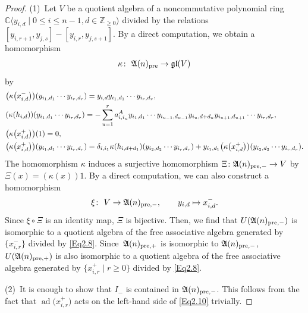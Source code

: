 \documentclass[pdftex]{sigma}
\numberwithin{equation}{section}
\theoremstyle{definition}
\DeclareMathOperator{\ad}{ad}
\begin{document}
\begin{proof} %
\textup{(1)}\ Let $V$ be a quotient algebra of a noncommutative polynomial ring $\mathbb{C}\langle y_{i,d}\mid0\leq i\leq n-1,d\in\mathbb{Z}_{\geq0}\rangle$ divided by the relations $[y_{i,r+1},y_{j,s}]-[y_{i,r},y_{j,s+1}]$. By a direct computation, we obtain a homomorphism
\begin{align*}
\kappa\colon\ \mathfrak{A}(n)_{{\rm pre}}\to\mathfrak{gl}(V)
\end{align*}
by
\begin{align*}
\begin{split}
&\bigl(\kappa\bigl(x^-_{i,d}\bigr)\bigr)(y_{i_1,d_1}\cdots y_{i_r,d_r})=y_{i,d}y_{i_1,d_1}\cdots y_{i_r,d_r},\\
&(\kappa(h_{i,d}))(y_{i_1,d_1}\cdots y_{i_r,d_r})=-\sum_{u=1}^r\limits a^A_{i,i_u}y_{i_1,d_1}\cdots y_{i_{u-1},d_{u-1}}y_{i_u,d+d_u}y_{i_{u+1},d_{u+1}}\cdots y_{i_r,d_r},\\
&\bigl(\kappa\bigl(x^+_{i,d}\bigr)\bigr)(1)=0,\\
&\bigl(\kappa\bigl(x^+_{i,d}\bigr)\bigr)(y_{i_1,d_1}\cdots y_{i_r,d_r})=\delta_{i,i_1}\kappa(h_{i,d+d_1})(y_{i_2,d_2}\cdots y_{i_r,d_r})+y_{i_1,d_1}\bigl(\kappa\bigl(x^+_{i,d}\bigr)\bigr)(y_{i_2,d_2}\cdots y_{i_r,d_r}).
\end{split}
\end{align*}
The homomorphism $\kappa$ induces a surjective homomorphism $\Xi\colon \mathfrak{A}(n)_{{\rm pre},-}\to V$ by $\Xi(x)=(\kappa(x))1$.
By a direct computation, we can also construct a homomorphism
\begin{align*}
\xi\colon\ V\to \mathfrak{A}(n)_{{\rm pre},-},\qquad y_{i,d}\mapsto x^-_{i,d}.
\end{align*}
Since $\xi\circ\Xi$ is an identity map, $\Xi$ is bijective. Then, we find that $U(\mathfrak{A}(n)_{{\rm pre},-})$ is isomorphic to a quotient algebra of the free associative algebra generated by $\{x^-_{i,r}\}$ divided by \eqref{Eq2.8}. Since~$\mathfrak{A}(n)_{{\rm pre},+}$ is isomorphic to $\mathfrak{A}(n)_{{\rm pre},-}$, $U(\mathfrak{A}(n)_{{\rm pre},+})$ is also isomorphic to a quotient algebra of the free associative algebra generated by $\bigl\{x^+_{i,r}\mid r\geq0\bigr\}$ divided by \eqref{Eq2.8}.

\textup{(2)}\ It is enough to show that $I_-$ is contained in $\mathfrak{A}(n)_{{\rm pre},-}$. This follows from the fact that $\ad\bigl(x^+_{i,r}\bigr)$ acts on the left-hand side of \eqref{Eq2.10} trivially.
\end{proof}
\end{document}
